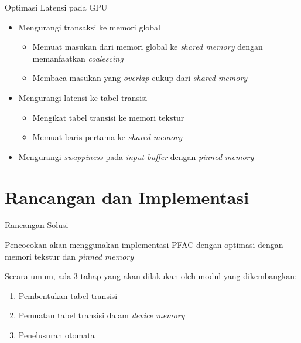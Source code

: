 \documentclass[10pt]{beamer}
\begin{document}
\begin{frame}{Optimasi Latensi pada GPU}
    \begin{itemize}

        \item Mengurangi transaksi ke memori global
        \begin{itemize}
            \item Memuat masukan dari memori global ke \emph{shared memory} dengan memanfaatkan \emph{coalescing}
            \item Membaca masukan yang \emph{overlap} cukup dari \emph{shared memory}
        \end{itemize}

        \item Mengurangi latensi ke tabel transisi
        \begin{itemize}
            \item Mengikat tabel transisi ke memori tekstur
            \item Memuat baris pertama ke \emph{shared memory}
        \end{itemize}

        \item Mengurangi \emph{swappiness} pada \emph{input buffer} dengan \emph{pinned memory}

    \end{itemize}
\end{frame}

\section{Rancangan dan Implementasi}

\begin{frame}{Rancangan Solusi}
    
    Pencocokan akan menggunakan implementasi PFAC dengan optimasi dengan memori tekstur dan \emph{pinned memory}

    Secara umum, ada 3 tahap yang akan dilakukan oleh modul yang dikembangkan:
    \begin{enumerate}
        
        \item Pembentukan tabel transisi
        
        \item Pemuatan tabel transisi dalam \emph{device memory}
        
        \item Penelusuran otomata

    \end{enumerate}
\end{frame}
\end{document}
